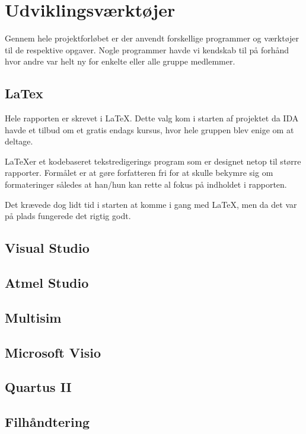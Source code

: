 \chapter{Udviklingsværktøjer}
Gennem hele projektforløbet er der anvendt forskellige programmer og værktøjer til de respektive opgaver. Nogle programmer havde vi kendskab til på forhånd hvor andre var helt ny for enkelte eller alle gruppe medlemmer.

\section{LaTex}
Hele rapporten er skrevet i \LaTeX. Dette valg kom i starten af projektet da IDA havde et tilbud om et gratis endags kursus, hvor hele gruppen blev enige om at deltage. 

\LaTeX er et kodebaseret tekstredigerings program som er designet netop til større rapporter. Formålet er at gøre forfatteren fri for at skulle bekymre sig om formateringer således at han/hun kan rette al fokus på indholdet i rapporten.

Det krævede dog lidt tid i starten at komme i gang med \LaTeX, men da det var på plads fungerede det rigtig godt. 

\section{Visual Studio}

\section{Atmel Studio}

\section{Multisim}

\section{Microsoft Visio} %

\section{Quartus II}

\section{Filhåndtering}

